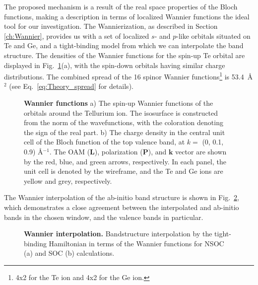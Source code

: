 The proposed mechanism is a result of the real space properties of the Bloch functions, making a description in terms of localized Wannier functions the ideal tool for our investigation.
The Wannierization, as described in Section \ref{ch:Wannier}, provides us with a set of localized $s$- and $p$-like orbitals situated on Te and Ge, and a tight-binding model from which we can interpolate the band structure.
The densities of the Wannier functions for the spin-up Te orbital are displayed in Fig.~\ref{fig:Rashba_wannierfunctions}(a), with the spin-down orbitals having similar charge distributions.
The combined spread of the 16 spinor Wannier functions\footnote{4x2 for the Te ion and 4x2 for the Ge ion.} is 53.4~\AA$^2$ (see Eq.~\eqref{eq:Theory_spread} for details).
\begin{figure}
\caption{\label{fig:Rashba_wannierfunctions}{\bf Wannier functions} a) The spin-up Wannier functions of the orbitals around the Tellurium ion. The isosurface is constructed from the norm of the wavefunctions, with the coloration denoting the sign of the real part. b) The charge density in the central unit cell of the Bloch function of the top valence band, at $k=$ (0, 0.1, 0.9) \AA$^{-1}$. The \gls{OAM} ($\bm L$), polarization ($\bm P$), and $\bm k$ vector are shown by the red, blue, and green arrows, respectively. In each panel, the unit cell is denoted by the wireframe, and the Te and Ge ions are yellow and grey, respectively.}
\end{figure}
The Wannier interpolation of the ab-initio band structure is shown in Fig.~\ref{fig:Rashba_wannierization}, which demonstrates a close agreement between the interpolated and ab-initio bands in the chosen window, and the valence bands in particular. 
\begin{figure}
\caption{\label{fig:Rashba_wannierization}{\bf Wannier interpolation.} Bandstructure interpolation by the tight-binding Hamiltonian in terms of the Wannier functions for \gls{NSOC} (a) and \gls{SOC} (b) calculations.}
\end{figure}
    
